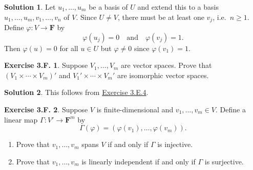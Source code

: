 \documentclass[12pt]{article}
\theoremstyle{definition}
\theoremstyle{exercise}
\newtheorem{exercise}{Exercise 3.F.}
\theoremstyle{solution}
\newtheorem*{solution}{Solution}
\newcommand{\quand}{\quad \text{and} \quad}
\newcommand{\F}{\mathbf{F}}
\begin{document}
\begin{solution}
    Let \( u_1, \ldots, u_m \) be a basis of \( U \) and extend this to a basis \( u_1, \ldots, u_m, v_1, \ldots, v_n \) of \( V \). Since \( U \neq V \), there must be at least one \( v_j \), i.e.\ \( n \geq 1 \). Define \( \varphi : V \to \F \) by
    \[
        \varphi(u_j) = 0 \quand \varphi(v_j) = 1.
    \]
    Then \( \varphi(u) = 0 \) for all \( u \in U \) but \( \varphi \neq 0 \) since \( \varphi(v_1) = 1 \).
\end{solution}

\begin{exercise}
\label{ex:5}
    Suppose \( V_1, \ldots, V_m \) are vector spaces. Prove that \( (V_1 \times \cdots \times V_m)' \) and \( V_1' \times \cdots \times V_m' \) are isomorphic vector spaces.
\end{exercise}

\begin{solution}
    This follows from \href{https://lew98.github.io/Mathematics/LADR_Section_3_E_Exercises.pdf}{Exercise 3.E.4}.
\end{solution}

\begin{exercise}
\label{ex:6}
    Suppose \( V \) is finite-dimensional and \( v_1, \ldots, v_m \in V \). Define a linear map \( \Gamma : V' \to \F^m \) by
    \[
        \Gamma(\varphi) = (\varphi(v_1), \ldots, \varphi(v_m)).
    \]
    \begin{enumerate}
        \item Prove that \( v_1, \ldots, v_m \) spans \( V \) if and only if \( \Gamma \) is injective.

        \item Prove that \( v_1, \ldots, v_m \) is linearly independent if and only if \( \Gamma \) is surjective.
    \end{enumerate}
\end{exercise}
\end{document}
